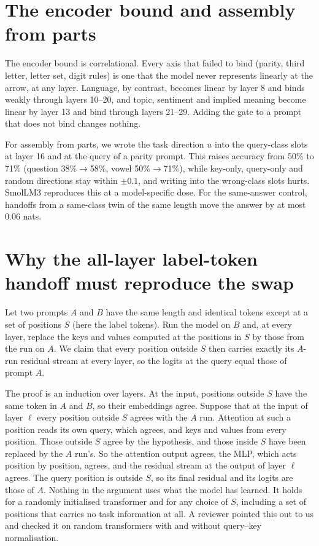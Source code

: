 \documentclass{article}
\begin{document}
\section{The encoder bound and assembly from parts}\label{app:encoder}
The encoder bound is correlational. Every axis that failed to bind (parity, third letter, letter set, digit rules) is one that the model never represents linearly at the arrow, at any layer. Language, by contrast, becomes linear by layer 8 and binds weakly through layers 10--20, and topic, sentiment and implied meaning become linear by layer 13 and bind through layers 21--29. Adding the gate to a prompt that does not bind changes nothing.

For assembly from parts, we wrote the task direction $u$ into the query-class slots at layer 16 and at the query of a parity prompt. This raises accuracy from 50\% to 71\% (question 38\%$\to$58\%, vowel 50\%$\to$71\%), while key-only, query-only and random directions stay within $\pm0.1$, and writing into the wrong-class slots hurts. SmolLM3 reproduces this at a model-specific dose. For the same-answer control, handoffs from a same-class twin of the same length move the answer by at most 0.06 nats.

\section{Why the all-layer label-token handoff must reproduce the swap}\label{app:induction}
Let two prompts $A$ and $B$ have the same length and identical tokens except at a set of positions $S$ (here the label tokens). Run the model on $B$ and, at every layer, replace the keys and values computed at the positions in $S$ by those from the run on $A$. We claim that every position outside $S$ then carries exactly its $A$-run residual stream at every layer, so the logits at the query equal those of prompt $A$.

The proof is an induction over layers. At the input, positions outside $S$ have the same token in $A$ and $B$, so their embeddings agree. Suppose that at the input of layer $\ell$ every position outside $S$ agrees with the $A$ run. Attention at such a position reads its own query, which agrees, and keys and values from every position. Those outside $S$ agree by the hypothesis, and those inside $S$ have been replaced by the $A$ run's. So the attention output agrees, the MLP, which acts position by position, agrees, and the residual stream at the output of layer $\ell$ agrees. The query position is outside $S$, so its final residual and its logits are those of $A$. Nothing in the argument uses what the model has learned. It holds for a randomly initialised transformer and for any choice of $S$, including a set of positions that carries no task information at all. A reviewer pointed this out to us and checked it on random transformers with and without query--key normalisation.
\end{document}
